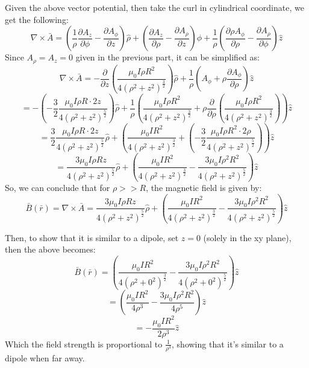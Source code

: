 \documentclass{article}
\begin{document}
Given the above vector potential, then take the curl in cylindrical coordinate, we get the following:
$$\nabla\times \bar{A}=\left(\frac{1}{\rho}\frac{\partial A_z}{\partial \phi}-\frac{\partial A_\phi}{\partial z}\right)\hat{\rho}+\left(\frac{\partial A_z}{\partial \rho}-\frac{\partial A_\rho}{\partial z}\right)\hat{\phi}+\frac{1}{\rho}\left(\frac{\partial \rho A_\phi}{\partial \rho}-\frac{\partial A_\rho}{\partial \phi}\right)\hat{z}$$
Since $A_\rho=A_z=0$ given in the previous part, it can be simplified as:
$$\nabla\times \bar{A}=-\frac{\partial}{\partial z}\left(\frac{\mu_0I\rho R^2}{4(\rho^2+z^2)^\frac{3}{2}}\right)\hat{\rho}+\frac{1}{\rho}\left(A_\phi+\rho\frac{\partial A_\phi}{\partial \rho}\right)\hat{z}$$
$$=-\left(-\frac{3}{2}\frac{\mu_0I\rho R\cdot 2z}{4(\rho^2+z^2)^\frac{5}{2}}\right)\hat{\rho}+\frac{1}{\rho}\left(\frac{\mu_0I\rho R^2}{4(\rho^2+z^2)^\frac{3}{2}}+\rho \frac{\partial}{\partial \rho}\left(\frac{\mu_0I\rho R^2}{4(\rho^2+z^2)^\frac{3}{2}}\right)\right)\hat{z}$$
$$=\frac{3}{2}\frac{\mu_0I\rho R\cdot 2z}{4(\rho^2+z^2)^\frac{5}{2}}\hat{\rho}+\left(\frac{\mu_0IR^2}{4(\rho^2+z^2)^{\frac{3}{2}}}+\left(-\frac{3}{2}\frac{\mu_0I\rho R^2\cdot 2\rho}{4(\rho^2+z^2)^{\frac{5}{2}}}\right)\right)\hat{z}$$
$$=\frac{3\mu_0I\rho Rz}{4(\rho^2+z^2)^\frac{5}{2}}\hat{\rho}+\left(\frac{\mu_0IR^2}{4(\rho^2+z^2)^{\frac{3}{2}}}-\frac{3\mu_0I\rho^2 R^2}{4(\rho^2+z^2)^{\frac{5}{2}}}\right)\hat{z}$$
So, we can conclude that for $\rho >> R$, the magnetic field is given by:
$$\bar{B}(\bar{r})=\nabla\times \bar{A}=\frac{3\mu_0I\rho Rz}{4(\rho^2+z^2)^\frac{5}{2}}\hat{\rho}+\left(\frac{\mu_0IR^2}{4(\rho^2+z^2)^{\frac{3}{2}}}-\frac{3\mu_0I\rho^2 R^2}{4(\rho^2+z^2)^{\frac{5}{2}}}\right)\hat{z}$$

Then, to show that it is similar to a dipole, set $z=0$ (solely in the xy plane), then the above becomes:
$$\bar{B}(\bar{r})=\left(\frac{\mu_0IR^2}{4(\rho^2+0^2)^{\frac{3}{2}}}-\frac{3\mu_0I\rho^2 R^2}{4(\rho^2+0^2)^{\frac{5}{2}}}\right)\hat{z}$$
$$=\left(\frac{\mu_0IR^2}{4\rho^3}-\frac{3\mu_0I\rho^2R^2}{4\rho^5}\right)\hat{z}$$
$$=-\frac{\mu_0IR^2}{2\rho^3}\hat{z}$$
Which the field strength is proportional to $\frac{1}{\rho^3}$, showing that it's similar to a dipole when far away.
\end{document}
